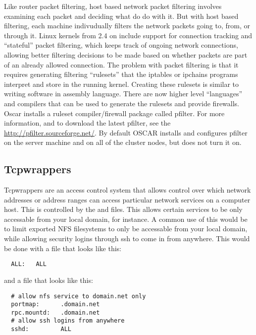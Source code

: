 Like router packet filtering, host based network packet filtering
involves examining each packet and deciding what do do with it.  But
with host based filtering, each machine indivudually filters the
network packets going to, from, or through it.  Linux kernels from 2.4
on include support for connection tracking and ``stateful'' packet 
filtering, which keeps track of ongoing network connections, allowing better
filtering decisions to be made based on whether packets are part of an
already allowed connection. The problem with packet filtering is that
it requires generating filtering ``rulesets'' that the iptables or 
ipchains programs interpret and store in the running kernel.
Creating these rulesets is similar to writing software in
assembly language. There are now higher level ``languages'' and 
compilers that can be used to generate the rulesets and provide firewalls.
Oscar installs a ruleset compiler/firewall package called pfilter.
For more information, and to download the latest
pfilter, see the \url{http://pfilter.sourceforge.net/}.
By default OSCAR installs and configures pfilter on the server machine
and on all of the cluster nodes, but does not turn it on. 

\subsection{Tcpwrappers}

Tcpwrappers are an access control system that allows control over which
network addresses or address ranges can access particular network services
on a computer host.  This is controlled by the  and
 files. This allows certain services to be only 
accessable from your local domain, for instance.  A common use of this
would be to limit exported NFS filesystems to only be accessable from
your local domain, while allowing security logins through ssh to come
in from anywhere.  This would be done with a  file 
that looks like this:

\begin{verbatim}
  ALL:   ALL
\end{verbatim}

\noindent and a  file that looks like this:

\begin{verbatim}
  # allow nfs service to domain.net only
  portmap:      .domain.net
  rpc.mountd:   .domain.net
  # allow ssh logins from anywhere
  sshd:         ALL
\end{verbatim}

